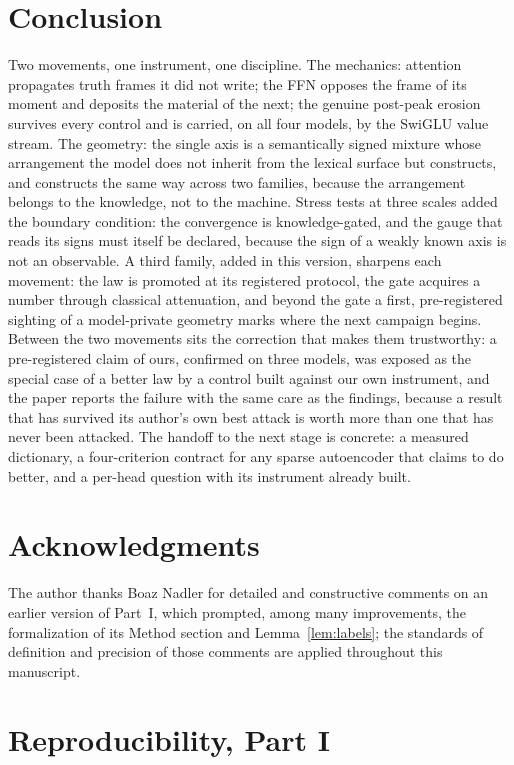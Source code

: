 \documentclass[11pt]{article}
\begin{document}
\section{Conclusion}

Two movements, one instrument, one discipline. The mechanics: attention
propagates truth frames it did not write; the FFN opposes the frame of its
moment and deposits the material of the next; the genuine post-peak erosion
survives every control and is carried, on all four models, by the SwiGLU
value stream. The geometry: the single axis is a semantically signed
mixture whose arrangement the model does not inherit from the lexical
surface but constructs, and constructs the same way across two families,
because the arrangement belongs to the knowledge, not to the machine.
Stress tests at three scales added the boundary condition: the
convergence is knowledge-gated, and the gauge that reads its signs must
itself be declared, because the sign of a weakly known axis is not an
observable.
A third family, added in this version, sharpens each movement: the law is
promoted at its registered protocol, the gate acquires a number through
classical attenuation, and beyond the gate a first, pre-registered
sighting of a model-private geometry marks where the next campaign
begins.
Between the two movements sits the correction that makes them trustworthy:
a pre-registered claim of ours, confirmed on three models, was exposed as
the special case of a better law by a control built against our own
instrument, and the paper reports the failure with the same care as the
findings, because a result that has survived its author's own best attack is
worth more than one that has never been attacked. The handoff to the next
stage is concrete: a measured dictionary, a four-criterion contract for
any sparse autoencoder that claims to do better, and a per-head question
with its instrument already built.


\section*{Acknowledgments}

The author thanks Boaz Nadler for detailed and constructive comments on an
earlier version of Part~I, which prompted, among many improvements, the
formalization of its Method section and Lemma~\ref{lem:labels}; the
standards of definition and precision of those comments are applied
throughout this manuscript.

\section{Reproducibility, Part I}
\label{sec:repro}
\end{document}
